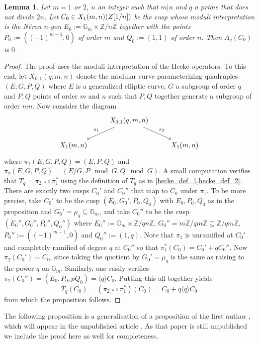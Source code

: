 \documentclass[11pt,reqno]{amsart}
\newtheorem{lemma}[theorem]{Lemma}
\theoremstyle{definition}
\numberwithin{equation}{section}
\newcommand{\Z}{\mathbb{Z}}
\def\torz#1{\mathbb Z /#1 \mathbb Z}
\newcommand{\diamondop}[1]{\langle #1 \rangle} %
\begin{document}
\begin{lemma}\label{lem:special_cusp}
Let $m=1$ or $2$, $n$ an integer such that $m|n$ and $q$ a prime that does not divide $2n$. Let $C_0 \in X_1(m,n)(\mathbb \Z[1/n])$ be the cusp whose moduli interpretation is the  N\'eron $n$-gon $E_0 := \mathbb G_m \times \torz{n}$ together with the points $P_0:=((-1)^{m-1},0)$ of order $m$ and $Q_0 :=(1,1)$ of order $n$. Then $A_q(C_0)$ is $0$.
\end{lemma}
\begin{proof}
    The proof uses the moduli interpretation of the Hecke operators. To this end, let $X_{0,1}(q,m,n)$ denote the modular curve parameterizing quadruples $(E,G,P,Q)$ where $E$ is a generalized elliptic curve, $G$ a subgroup of order $q$ and $P,Q$ points of order $m$ and $n$ such that $P,Q$ together generate a subgroup of order $mn$. Now consider the diagram
\[
\begin{tikzcd}
& X_{0,1}(q,m,n) \arrow[dl, "\pi_1"'] \arrow[dr, "\pi_2"] & \\
X_{1}(m,n) & & X_1(m,n)
\end{tikzcd}
\]
where $\pi_1(E,G,P,Q) = (E,P,Q)$ and $\pi_2(E,G,P,Q) =(E/G,P \mod G,Q \mod G)$. A small computation verifies that $T_q = \pi_{2,*} \circ \pi_1^*$ using the definition of $T_q$ as in \cref{hecke_def_1,hecke_def_2}. There are exactly two cusps $C_0'$ and $C_0''$ that map to $C_0$ under $\pi_1$. To be more precise, take $C_0'$ to be the cusp $(E_0,G_0',P_0,Q_0)$ with $E_0,P_0,Q_0$ as in the proposition and $G_0' = \mu_q \subseteq \mathbb G_m$, and take $C_0''$ to be the cusp $(E_0'',G_0'',P_0'',Q_0'')$ where $E_0'' := \mathbb G_m \times \torz{qn}$, $G_0'' = m\Z/qm\Z \subseteq \Z/qm\Z$, $P_0'':=((-1)^{m-1},0)$ and $Q_0'' :=(1,q)$. Note that $\pi_1$ is unramified at $C_0'$ and completely ramified of degree $q$ at $C_0''$ so that $\pi_1^*(C_0) = C_0'+qC_0''$. Now $\pi_2(C_0')=C_0$, since taking the quotient by $G_0'=\mu_q$ is the same as raising to the power $q$ on $\mathbb G_m$.  Similarly, one easily verifies $\pi_2(C_0'')=(E_0,P_0,pQ_0) = \diamondop{q}C_0$. Putting this all together yields $$T_q(C_0)=(\pi_{2,*} \circ \pi_1^*)(C_0)=C_0+q\diamondop{q} C_0$$ from which the proposition follows.

\end{proof}

The following proposition is a generalisation of a proposition of the first author \cite[Proposition 7.1]{DKSS}, which will appear in the unpublished article \cite{derickxstoll}. As that paper is still unpublished we include the proof here as well for completeness.
\end{document}
